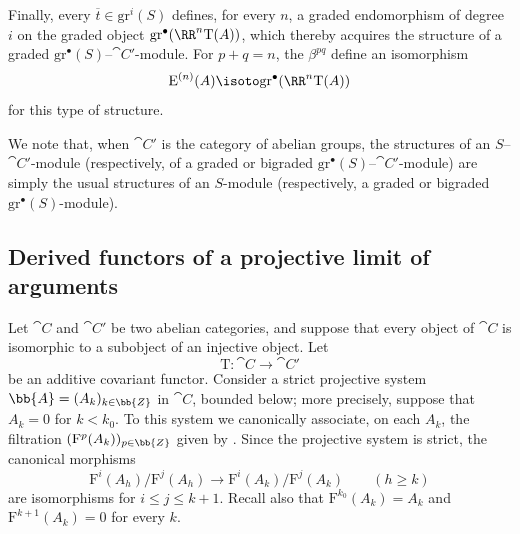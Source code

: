 \begin{env}[13.6.6]
Finally, every $\overline{t}\in\mathrm{gr}^i(S)$ defines, for every
$n$, a graded endomorphism of degree $i$ on the graded object
$\mathrm{gr}^\bullet(\RR^n\mathrm{T}(A))$, which thereby acquires the
structure of a graded
$\mathrm{gr}^\bullet(S)$--$\cat{C}'$-module.
For $p+q=n$, the $\beta^{pq}$ define an isomorphism
\[
  \mathrm{E}^{(n)}(A)
  \isoto
  \mathrm{gr}^\bullet(\RR^n\mathrm{T}(A))
\]
for this type of structure.

We note that, when $\cat{C}'$ is the category of abelian groups, the
structures of an $S$--$\cat{C}'$-module (respectively, of a graded or
bigraded $\mathrm{gr}^\bullet(S)$--$\cat{C}'$-module) are simply the
usual structures of an $S$-module (respectively, a graded or
bigraded $\mathrm{gr}^\bullet(S)$-module).
\end{env}

\subsection{Derived functors of a projective limit of arguments}
\label{subsection:0.13.7}

\begin{env}[13.7.1]
\label{0.13.7.1}
Let $\cat{C}$ and $\cat{C}'$ be two abelian categories, and suppose
that every object of $\cat{C}$ is isomorphic to a subobject of an
injective object.
Let
\[
  \mathrm{T}:\cat{C}\longrightarrow\cat{C}'
\]
be an additive covariant functor.
Consider a strict projective system
$\bb{A}=(A_k)_{k\in\bb{Z}}$ in $\cat{C}$, bounded below; more
precisely, suppose that $A_k=0$ for $k<k_0$.
To this system we canonically associate, on each $A_k$, the
filtration $(\mathrm{F}^p(A_k))_{p\in\bb{Z}}$ given by
.
Since the projective system is strict, the canonical morphisms
\begin{equation}
\label{0.13.7.1.1}
\tag{13.7.1.1}
  \mathrm{F}^i(A_h)/\mathrm{F}^j(A_h)
  \longrightarrow
  \mathrm{F}^i(A_k)/\mathrm{F}^j(A_k)
  \qquad(h\geq k)
\end{equation}
are isomorphisms for $i\leq j\leq k+1$.
Recall also that
$\mathrm{F}^{k_0}(A_k)=A_k$ and
$\mathrm{F}^{k+1}(A_k)=0$ for every $k$.
\end{env}

